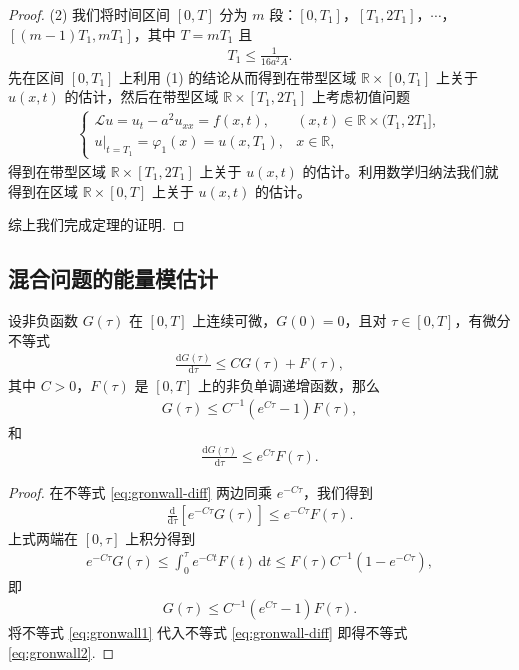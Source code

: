\documentclass[../../main.tex]{subfiles}%
\begin{document}
\begin{proof}
(2) 我们将时间区间 $[0,T]$ 分为 $m$ 段：$[0,T_1]$，$[T_1,2T_1]$，$\cdots$，$[(m-1)T_1,mT_1]$，其中 $T=mT_1$ 且
\begin{align*}
T_1\leqslant \frac{1}{16a^2A}.
\end{align*}
先在区间 $[0,T_1]$ 上利用 (1) 的结论从而得到在带型区域 $\mathbb{R}\times[0,T_1]$ 上关于 $u(x,t)$ 的估计，然后在带型区域 $\mathbb{R}\times[T_1,2T_1]$ 上考虑初值问题
\begin{align*}
\begin{cases}
\mathcal{L}u=u_t-a^2u_{xx}=f(x,t), & (x,t)\in\mathbb{R}\times(T_1,2T_1],\\
u|_{t=T_1}=\varphi_1(x)=u(x,T_1), & x\in\mathbb{R},
\end{cases}
\end{align*}
得到在带型区域 $\mathbb{R}\times[T_1,2T_1]$ 上关于 $u(x,t)$ 的估计。利用数学归纳法我们就得到在区域 $\mathbb{R}\times[0,T]$ 上关于 $u(x,t)$ 的估计。

综上我们完成定理的证明.
\end{proof}


\subsection{混合问题的能量模估计}

\begin{lemma}
设非负函数 $G(\tau)$ 在 $[0,T]$ 上连续可微，$G(0)=0$，且对 $\tau\in[0,T]$，有微分不等式
\begin{align}
\frac{\mathrm{d}G(\tau)}{\mathrm{d}\tau}\leqslant CG(\tau)+F(\tau), \label{eq:gronwall-diff}
\end{align}
其中 $C>0$，$F(\tau)$ 是 $[0,T]$ 上的非负单调递增函数，那么
\begin{align}
G(\tau)\leqslant C^{-1}(e^{C\tau}-1)F(\tau), \label{eq:gronwall1}
\end{align}
和
\begin{align}
\frac{\mathrm{d}G(\tau)}{\mathrm{d}\tau}\leqslant e^{C\tau}F(\tau). \label{eq:gronwall2}
\end{align}
\end{lemma}
\begin{proof}
在不等式 \eqref{eq:gronwall-diff} 两边同乘 $e^{-C\tau}$，我们得到
\begin{align*}
\frac{\mathrm{d}}{\mathrm{d}\tau}[e^{-C\tau}G(\tau)]\leqslant e^{-C\tau}F(\tau).
\end{align*}
上式两端在 $[0,\tau]$ 上积分得到
\begin{align*}
e^{-C\tau}G(\tau)\leqslant \int_0^\tau e^{-Ct}F(t)\,\mathrm{d}t\leqslant F(\tau)C^{-1}(1-e^{-C\tau}),
\end{align*}
即
\begin{align*}
G(\tau)\leqslant C^{-1}(e^{C\tau}-1)F(\tau).
\end{align*}
将不等式 \eqref{eq:gronwall1} 代入不等式 \eqref{eq:gronwall-diff} 即得不等式 \eqref{eq:gronwall2}.
\end{proof}
\end{document}
